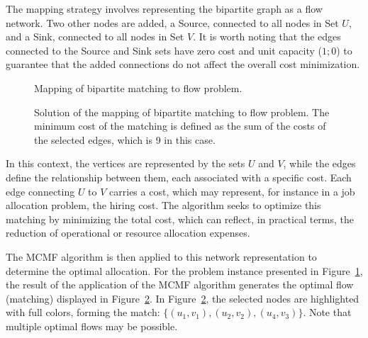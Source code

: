             The mapping strategy involves representing the bipartite graph as a flow network. 
            Two other nodes are added, a Source, connected to all nodes in Set $U$, and a Sink, connected to all nodes in Set $V$. 
            It is worth noting that the edges connected to the Source and Sink sets have zero cost and unit capacity ($1;0$) to guarantee that the added connections do not affect the overall cost minimization.
            
            \begin{figure}[ht] \centering
                
                \caption{Mapping of bipartite matching to flow problem.}
                \label{fig:mcmf} 
            \end{figure}
            
            \begin{figure}[ht] \centering 
                
                \caption[Solution of the mapping of bipartite matching to flow problem.]{Solution of the mapping of bipartite matching to flow problem. The minimum cost of the matching is defined as the sum of the costs of the selected edges, which is 9 in this case.}
                \label{fig:solucao_mcmf}
            \end{figure}
            
            In this context, the vertices are represented by the sets $U$ and $V$, while the edges define the relationship between them, each associated with a specific cost. 
            Each edge connecting $U$ to $V$ carries a cost, which may represent, for instance in a job allocation problem, the hiring cost. 
            The algorithm seeks to optimize this matching by minimizing the total cost, which can reflect, in practical terms, the reduction of operational or resource allocation expenses.
            
            The MCMF algorithm is then applied to this network representation to determine the optimal allocation. 
            For the problem instance presented in Figure~\ref{fig:mcmf}, the result of the application of the MCMF algorithm generates the optimal flow (matching) displayed in Figure~\ref{fig:solucao_mcmf}.
            In Figure~\ref{fig:solucao_mcmf}, the selected nodes are highlighted with full colors, forming the match: $\{(u_1, v_1), (u_2, v_2), (u_4, v_3)\}$.
            Note that multiple optimal flows may be possible.
            
